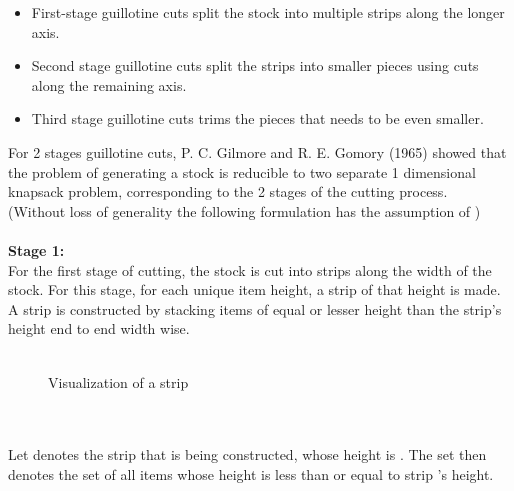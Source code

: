 \documentclass[a4paper]{article}
\begin{document}
    \begin{itemize}
        \item First-stage guillotine cuts split the stock into multiple strips along the longer axis.
        \item Second stage guillotine cuts split the strips into smaller pieces using cuts along the remaining axis.
        \item Third stage guillotine cuts trims the pieces that needs to be even smaller.
    \end{itemize}
    \pagebreak
    \noindent
    For 2 stages guillotine cuts, P. C. Gilmore and R. E. Gomory (1965)\cite{f6bab824-25b0-39e2-8f1e-13aaf2701321} showed that the problem of generating a stock  is reducible to two separate 1 dimensional knapsack problem, corresponding to the 2 stages of the cutting process.\\
    (Without loss of generality the following formulation has the assumption of )
    \\ \\
    \textbf{Stage 1:}\\
    \noindent
    For the first stage of cutting, the stock  is cut into strips along the width of the stock.
    For this stage, for each unique item height, a strip of that height is made. A strip is constructed by stacking items of equal or lesser height than the strip's height end to end width wise.
    \\ \\
    \begin{figure}[h]
        \centering
        \caption{Visualization of a strip}
    \end{figure}
    \\ \\
    Let  denotes the strip that is being constructed, whose height is . The set  then denotes the set of all items whose height is less than or equal to strip 's height.
\end{document}
